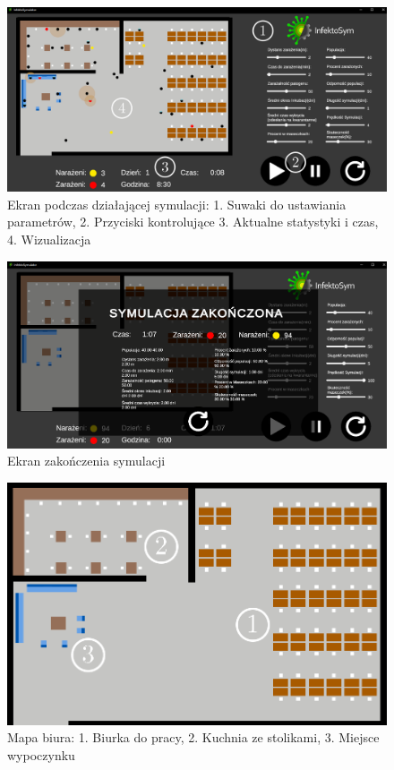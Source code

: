 \begin{figure}[h!]
	\includegraphics[width=\linewidth]{runningSimwithNumbers.png}
	\caption{Ekran podczas działającej symulacji: 1. Suwaki do ustawiania parametrów, 2. Przyciski kontrolujące 3. Aktualne statystyki i czas, 4. Wizualizacja}
\end{figure}

\begin{figure}[h!]
	\includegraphics[width=\linewidth]{endSim.png}
	\caption{Ekran zakończenia symulacji}
\end{figure}

\begin{figure}[h!]
	\includegraphics[width=\linewidth]{mapWithNumbers.png}
	\caption{Mapa biura: 1. Biurka do pracy, 2. Kuchnia ze stolikami, 3. Miejsce wypoczynku}
\end{figure}


